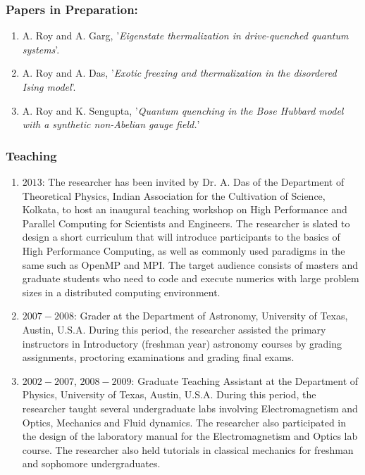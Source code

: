 \documentclass[a4paper,11pt,color]{article}
\begin{document}
\subsubsection{\sc Papers in Preparation:}
\begin{enumerate}
\item
A. Roy and A. Garg, '\textit{Eigenstate thermalization in drive-quenched quantum systems}'.
\item
A. Roy and A. Das, '\textit{Exotic freezing and thermalization in the disordered Ising model}'.
\item
A. Roy and K. Sengupta, '\textit{Quantum quenching in the Bose Hubbard model with a synthetic non-Abelian gauge field.}'
\end{enumerate}
\subsubsection{\sc Teaching}
\begin{enumerate}
\item
$2013$: The researcher has been invited by Dr. A. Das of the Department of Theoretical Physics, Indian Association for the Cultivation of Science, Kolkata, to host an inaugural teaching workshop on High Performance and Parallel Computing for Scientists and Engineers. The researcher is slated to design a short curriculum that will introduce participants to the basics of High Performance Computing, as well as commonly used paradigms in the same such as OpenMP and MPI. The target audience consists of masters and graduate students who need to code and execute numerics with large problem sizes in a distributed computing environment.
\item
$2007-2008$: Grader at the Department of Astronomy, University of Texas, Austin, U.S.A. During this period, the researcher assisted the primary instructors in Introductory (freshman year) astronomy courses by grading assignments, proctoring examinations and grading final exams.
\item 
$2002-2007$, $2008-2009$: Graduate Teaching Assistant at the Department of Physics, University of Texas, Austin, U.S.A. During this period, the researcher taught several undergraduate labs involving Electromagnetism and Optics, Mechanics and Fluid dynamics. The researcher also participated in the design of the laboratory manual for the Electromagnetism and Optics lab course. The researcher also held tutorials in classical mechanics for freshman and sophomore undergraduates.
\end{enumerate}
\end{document}
